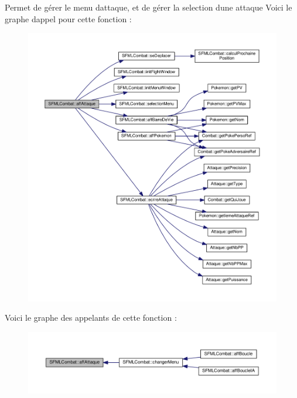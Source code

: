 Permet de gérer le menu d\textquotesingle{}attaque, et de gérer la selection d\textquotesingle{}une attaque Voici le graphe d\textquotesingle{}appel pour cette fonction \+:\nopagebreak
\begin{figure}[H]
\begin{center}
\leavevmode
\includegraphics[width=350pt]{class_s_f_m_l_combat_a8803b5fb491ebcba31787b0aa20a9c07_cgraph}
\end{center}
\end{figure}
Voici le graphe des appelants de cette fonction \+:\nopagebreak
\begin{figure}[H]
\begin{center}
\leavevmode
\includegraphics[width=350pt]{class_s_f_m_l_combat_a8803b5fb491ebcba31787b0aa20a9c07_icgraph}
\end{center}
\end{figure}
\mbox{\label{class_s_f_m_l_combat_ad5ab6d579c0da644135ae1e51e44f890}} 
